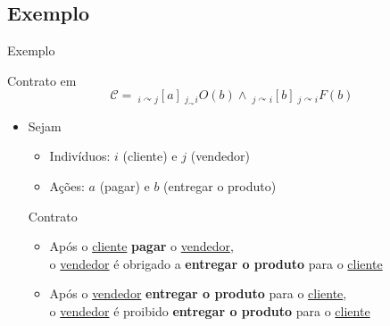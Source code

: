 \subsection{Exemplo}
\begin{frame}{Exemplo}
    \begin{block}{Contrato em \CL}
        $$\mathcal{C} =\ _{i\curvearrowright j}[a]\ _{j_\curvearrowright i}O(b) \wedge \ _{j\curvearrowright i}[b]\ _{j\curvearrowright i}F(b)$$
    \end{block}
    
    \begin{itemize}
        \item Sejam
        \begin{itemize}
            \item Indivíduos: $i$ (cliente) e $j$ (vendedor)
            \item Ações: $a$ (pagar) e $b$ (entregar o produto)
        \end{itemize}
        
        \begin{block}{Contrato}
            \begin{itemize}
                \item Após o \underline{cliente} \textbf{pagar} o \underline{vendedor}, \\ o \underline{vendedor} é obrigado a \textbf{entregar o produto} para o \underline{cliente}
                \item Após o \underline{vendedor} \textbf{entregar o produto} para o \underline{cliente}, \\ o \underline{vendedor} é proibido \textbf{entregar o produto} para o \underline{cliente}
            \end{itemize}
        \end{block}
    \end{itemize}
\end{frame}

